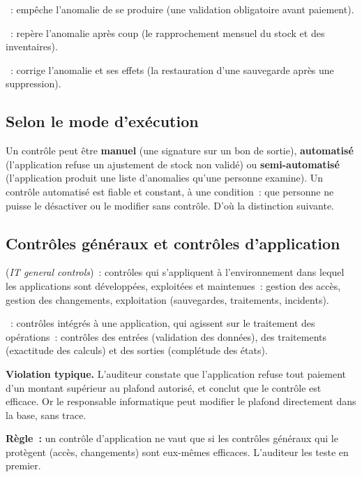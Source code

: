 \begin{boxdef}
~: empêche
l'anomalie de se produire (une validation obligatoire avant paiement).

\medskip
{}~: repère l'anomalie
après coup (le rapprochement mensuel du stock et des inventaires).

\medskip
{}~: corrige l'anomalie
et ses effets (la restauration d'une sauvegarde après une suppression).
\end{boxdef}

\subsection{Selon le mode d'exécution}

Un contrôle peut être \textbf{manuel} (une signature sur un bon de sortie),
\textbf{automatisé} (l'application refuse un ajustement de stock non
validé) ou \textbf{semi-automatisé} (l'application produit une liste
d'anomalies qu'une personne examine). Un contrôle automatisé est fiable et
constant, à une condition~: que personne ne puisse le désactiver ou le
modifier sans contrôle. D'où la distinction suivante.

\subsection{Contrôles généraux et contrôles d'application}

\begin{boxdef}
 (\textit{IT general controls})~: contrôles qui s'appliquent à
l'environnement dans lequel les applications sont développées, exploitées et
maintenues~: gestion des accès, gestion des changements, exploitation
(sauvegardes, traitements, incidents).

\medskip
{}~:
contrôles intégrés à une application, qui agissent sur le traitement des
opérations~: contrôles des entrées (validation des données), des traitements
(exactitude des calculs) et des sorties (complétude des états).
\end{boxdef}

\begin{boxalert}
\textbf{Violation typique.} L'auditeur constate que l'application refuse tout
paiement d'un montant supérieur au plafond autorisé, et conclut que le
contrôle est efficace. Or le responsable informatique peut modifier le
plafond directement dans la base, sans trace.

\smallskip
\textbf{Règle~:} un contrôle d'application ne vaut que si les contrôles
généraux qui le protègent (accès, changements) sont eux-mêmes efficaces.
L'auditeur les teste en premier.
\end{boxalert}

